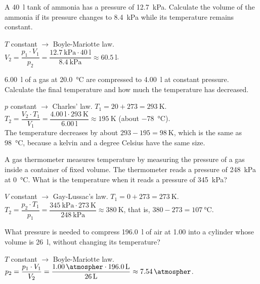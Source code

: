 \begin{exercise}
    A \qty{40}{\litre} tank of ammonia has a pressure of \qty{12.7}{\kilo\pascal}. Calculate the volume of the ammonia if its pressure changes to \qty{8.4}{\kilo\pascal} while its temperature remains constant.
    \begin{solu}
        \(T\) constant \(\to\) Boyle-Mariotte law. \\
        \(V_2 = \dfrac{p_1 \cdot V_1}{p_2} = \dfrac{\qty{12.7}{\kilo\pascal} \cdot \qty{40}{\litre}}{\qty{8.4}{\kilo\pascal}} \approx \qty{60.5}{\litre}\).
    \end{solu}
\end{exercise}

\begin{exercise}
    \qty{6.00}{\litre} of a gas at \qty{20.0}{\celsius} are compressed to \qty{4.00}{\litre} at constant pressure. Calculate the final temperature and how much the temperature has decreased.
    \begin{solu}
        \(p\) constant \(\to\) Charles' law. \(T_1 = 20 + 273 = \qty{293}{\kelvin}\). \\
        \(T_2 = \dfrac{V_2 \cdot T_1}{V_1} = \dfrac{\qty{4.00}{\litre} \cdot \qty{293}{\kelvin}}{\qty{6.00}{\litre}} \approx \qty{195}{\kelvin}\) (about \qty{-78}{\celsius}). \\
        The temperature decreases by about \(293 - 195 = \qty{98}{\kelvin}\), which is the same as \qty{98}{\celsius}, because a kelvin and a degree Celsius have the same size.
    \end{solu}
\end{exercise}

\begin{exercise}
    A gas thermometer measures temperature by measuring the pressure of a gas inside a container of fixed volume. The thermometer reads a pressure of \qty{248}{\kilo\pascal} at \qty{0}{\celsius}. What is the temperature when it reads a pressure of \qty{345}{\kilo\pascal}?
    \begin{solu}
        \(V\) constant \(\to\) Gay-Lussac's law. \(T_1 = 0 + 273 = \qty{273}{\kelvin}\). \\
        \(T_2 = \dfrac{p_2 \cdot T_1}{p_1} = \dfrac{\qty{345}{\kilo\pascal} \cdot \qty{273}{\kelvin}}{\qty{248}{\kilo\pascal}} \approx \qty{380}{\kelvin}\), that is, \(380 - 273 = \qty{107}{\celsius}\).
    \end{solu}
\end{exercise}

\begin{exercise}
    What pressure is needed to compress \qty{196.0}{\litre} of air at \qty{1.00}{\atmospher} into a cylinder whose volume is \qty{26}{\litre}, without changing its temperature?
    \begin{solu}
        \(T\) constant \(\to\) Boyle-Mariotte law. \\
        \(p_2 = \dfrac{p_1 \cdot V_1}{V_2} = \dfrac{\qty{1.00}{\atmospher} \cdot \qty{196.0}{\litre}}{\qty{26}{\litre}} \approx \qty{7.54}{\atmospher}\).
    \end{solu}
\end{exercise}

